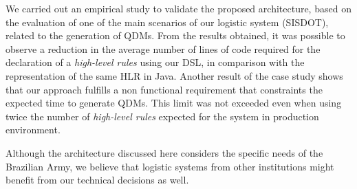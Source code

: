 \documentclass[twocolumn]{bmcart}%
\newcommand{\callers}{\emph{high-level rules}\xspace}
\newcommand{\shc}{HLR\xspace}
\begin{document}
We carried out an empirical study to validate the proposed architecture, based on the evaluation of one of the main scenarios of our logistic system (SISDOT), related to the generation of QDMs. From the results obtained, it was possible to observe a reduction in the average number of lines of code required for the declaration of a \callers using our DSL, in comparison with the representation of the same \shc in Java. Another result of the case study shows that our approach fulfills a non functional requirement that constraints the expected time to generate QDMs. This limit was not exceeded even when using twice the number of \callers expected for the system in production environment.

Although the architecture discussed here considers the specific needs of the Brazilian Army, we believe that logistic systems from other institutions might benefit from our technical decisions as well.





\end{document}
